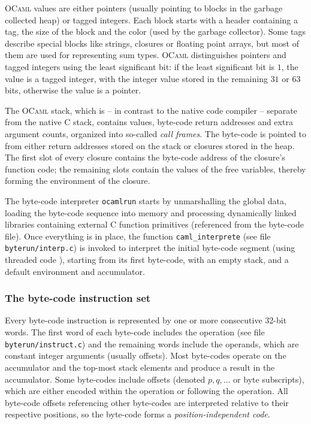 \documentclass[10pt,a4paper,twocolumn]{article}
\begin{document}
\textsc{OCaml} values are either pointers (usually pointing to blocks in the garbage collected
heap) or tagged integers. Each block starts with a header containing a tag, the size of the block
and the color (used by the garbage collector). Some tags describe special blocks like strings,
closures or floating point arrays, but most of them are used for representing sum types.
\textsc{OCaml} distinguishes pointers and tagged integers using the least significant bit: if
the least significant bit is $1$, the value is a tagged integer, with the integer value stored
in the remaining $31$ or $63$ bits, otherwise the value is a pointer.

The \textsc{OCaml} stack, which is -- in contrast to the native code compiler -- separate from
the native C stack, contains values, byte-code return addresses and extra argument counts,
organized into so-called \emph{call frames}. The byte-code is pointed to from either return
addresses stored on the stack or closures stored in the heap. The first slot of every closure
contains the byte-code address of the closure's function code; the remaining slots contain
the values of the free variables, thereby forming the environment of the closure.

The byte-code interpreter \texttt{ocamlrun} starts by unmarshalling the global data, loading
the byte-code sequence into memory and processing dynamically linked libraries containing
external C function primitives (referenced from the byte-code file). Once everything is in
place, the function \texttt{caml\_interprete} (see file \texttt{byterun/interp.c}) is invoked
to interpret the initial byte-code segment (using threaded code \cite{Bell73,ErtlGregg03}),
starting from its first byte-code, with an empty stack, and a default environment and accumulator.

\subsubsection{The byte-code instruction set}

Every byte-code instruction is represented by one or more consecutive 32-bit words. The
first word of each byte-code includes the operation (see file \texttt{byterun/instruct.c})
and the remaining words include the operands, which are constant integer arguments (usually
offsets). Most byte-codes operate on the accumulator and the top-most stack elements and
produce a result in the accumulator. Some byte-codes include offsets (denoted $p,q,\ldots$
or byte subscripts), which are either encoded within the operation or following the
operation. All byte-code offsets referencing other byte-codes are interpreted relative to their
respective positions, so the byte-code forms a \emph{position-independent code}.
\end{document}
